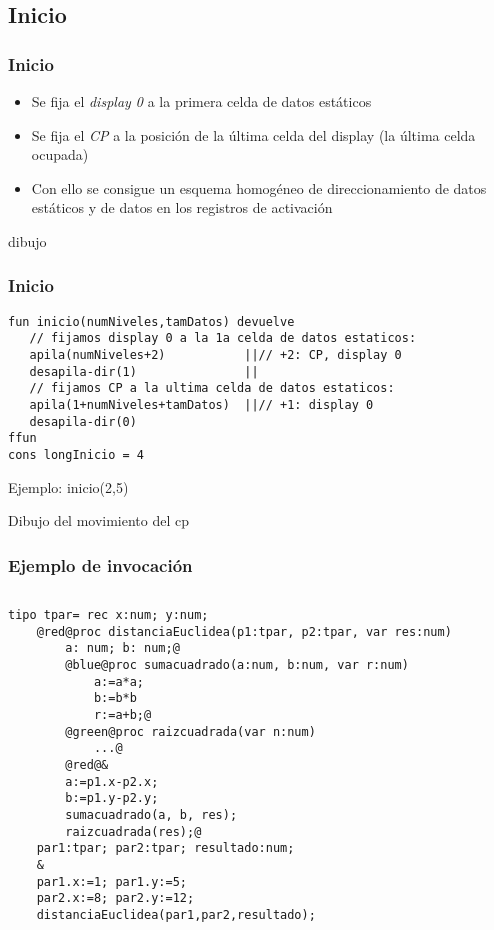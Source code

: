 \documentclass[hyperref={pdfpagelabels=false},tree-dvips]{beamer}
\begin{document}
\subsection{Inicio}
\begin{frame}[fragile]
\frametitle{Inicio}

\begin{itemize}[<+->]%
	\item Se fija el \emph{display 0} a la primera celda de datos estáticos
	\item Se fija el \emph{CP} a la posición de la última celda del display (la última celda ocupada)
	\item Con ello se consigue un esquema homogéneo de direccionamiento de datos estáticos y de datos en los registros de activación
\end{itemize}

dibujo

\end{frame}
\begin{frame}[fragile]
\frametitle{Inicio}
\begin{lstlisting}[style=codigoMP]
fun inicio(numNiveles,tamDatos) devuelve
   // fijamos display 0 a la 1a celda de datos estaticos:
   apila(numNiveles+2)           ||// +2: CP, display 0
   desapila-dir(1)               ||
   // fijamos CP a la ultima celda de datos estaticos:
   apila(1+numNiveles+tamDatos)  ||// +1: display 0
   desapila-dir(0)
ffun
cons longInicio = 4
\end{lstlisting}

Ejemplo: inicio(2,5)

Dibujo del movimiento del cp

\end{frame}
\begin{frame}[fragile]
\frametitle{Ejemplo de invocación}

\begin{columns}[T]
\begin{lstlisting}[style=codigo]
	tipo tpar= rec x:num; y:num;
	@red@proc distanciaEuclidea(p1:tpar, p2:tpar, var res:num)
	    a: num; b: num;@
	    @blue@proc sumacuadrado(a:num, b:num, var r:num)
            a:=a*a;
	        b:=b*b
	        r:=a+b;@
	    @green@proc raizcuadrada(var n:num)
	        ...@
	    @red@&
	    a:=p1.x-p2.x;
	    b:=p1.y-p2.y;
	    sumacuadrado(a, b, res);
	    raizcuadrada(res);@
	par1:tpar; par2:tpar; resultado:num;
	&
	par1.x:=1; par1.y:=5;
	par2.x:=8; par2.y:=12;
	distanciaEuclidea(par1,par2,resultado);
\end{lstlisting}
\end{columns}

\end{frame}
\end{document}
